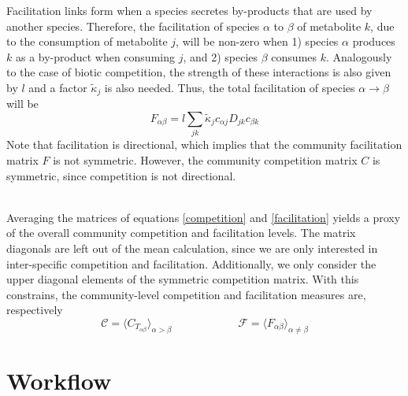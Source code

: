 \documentclass[12pt]{article}
\begin{document}
            Facilitation links form when a species secretes by-products that are used by another species. Therefore, the facilitation of species $\alpha$ to $\beta$ of metabolite $k$, due to the consumption of metabolite $j$, will be non-zero when 1) species $\alpha$ produces $k$ as a by-product when consuming $j$, and 2) species $\beta$ consumes $k$. Analogously to the case of biotic competition, the strength of these interactions is also given by $l$ and a factor $\tilde{\kappa}_j$ is also needed. Thus, the total facilitation of species $\alpha\rightarrow \beta$ will be
            \begin{equation}\label{facilitation}
                F_{\alpha \beta} = l\sum_{jk} \tilde{\kappa}_jc_{\alpha j}D_{jk}c_{\beta k}
            \end{equation}
            Note that facilitation is directional, which implies that the community facilitation matrix $F$ is not symmetric. However, the community competition matrix $C$ is symmetric, since competition is not directional.\par\\
            Averaging the matrices of equations \ref{competition} and \ref{facilitation} yields a proxy of the overall community competition and facilitation levels. The matrix diagonals are left out of the mean calculation, since we are only interested in inter-specific competition and facilitation. Additionally, we only consider the upper diagonal elements of the symmetric competition matrix. With this constrains, the community-level competition and facilitation measures are, respectively
            \begin{equation}
                \mathcal{C} =  \langle C_T_{\alpha \beta} \rangle_{\alpha > \beta}\qquad \qquad \qquad \mathcal{F} =  \langle F_{\alpha \beta} \rangle_{\alpha \neq \beta}
            \end{equation}

    \section{Workflow}
    
\end{document}
